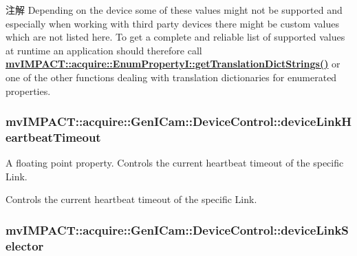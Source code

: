 \begin{DoxyNote}{注解}
Depending on the device some of these values might not be supported and especially when working with third party devices there might be custom values which are not listed here. To get a complete and reliable list of supported values at runtime an application should therefore call {\bfseries \hyperlink{classmv_i_m_p_a_c_t_1_1acquire_1_1_enum_property_i_a0ba6ccbf5ee69784d5d0b537924d26b6}{mv\+I\+M\+P\+A\+C\+T\+::acquire\+::\+Enum\+Property\+I\+::get\+Translation\+Dict\+Strings()}} or one of the other functions dealing with translation dictionaries for enumerated properties. 
\end{DoxyNote}
\hypertarget{classmv_i_m_p_a_c_t_1_1acquire_1_1_gen_i_cam_1_1_device_control_a5615dbc0a4661b0eb0afeb403ea3b92a}{
\subsubsection[{device\+Link\+Heartbeat\+Timeout}]{ mv\+I\+M\+P\+A\+C\+T\+::acquire\+::\+Gen\+I\+Cam\+::\+Device\+Control\+::device\+Link\+Heartbeat\+Timeout}}\label{classmv_i_m_p_a_c_t_1_1acquire_1_1_gen_i_cam_1_1_device_control_a5615dbc0a4661b0eb0afeb403ea3b92a}


A floating point property. Controls the current heartbeat timeout of the specific Link. 

Controls the current heartbeat timeout of the specific Link. \hypertarget{classmv_i_m_p_a_c_t_1_1acquire_1_1_gen_i_cam_1_1_device_control_a7ad8c7f703e9d2587dd376ee55a699da}{
\subsubsection[{device\+Link\+Selector}]{ mv\+I\+M\+P\+A\+C\+T\+::acquire\+::\+Gen\+I\+Cam\+::\+Device\+Control\+::device\+Link\+Selector}}\label{classmv_i_m_p_a_c_t_1_1acquire_1_1_gen_i_cam_1_1_device_control_a7ad8c7f703e9d2587dd376ee55a699da}


